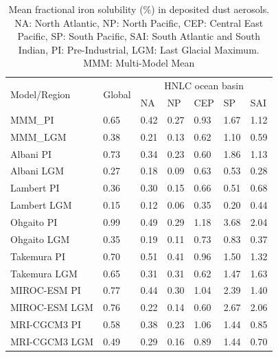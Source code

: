 \begin{table}[]
    \centering
    \begin{tabular}{||l|l|l|l|l|l|l||}
        \hline 
    \multirow{2}{*}{Model/Region} & \multirow{2}{*}{Global} & \multicolumn{5}{c}{HNLC ocean basin} \\
                                  &                         & NA    & NP    & CEP   & SP    & SAI  \\
    \hline \hline
    MMM\_PI                       & 0.65                    & 0.42  & 0.27  & 0.93  & 1.67  & 1.12 \\
    MMM\_LGM                      & 0.38                    & 0.21  & 0.13  & 0.62  & 1.10  & 0.59 \\
    Albani PI                     & 0.73                    & 0.34  & 0.23  & 0.60  & 1.86  & 1.13 \\
    Albani LGM                    & 0.27                    & 0.18  & 0.09  & 0.63  & 0.53  & 0.28 \\
    Lambert PI                    & 0.36                    & 0.30  & 0.15  & 0.66  & 0.51  & 0.68 \\
    Lambert LGM                   & 0.15                    & 0.12  & 0.06  & 0.35  & 0.20  & 0.44 \\
    Ohgaito PI                    & 0.99                    & 0.49  & 0.29  & 1.18  & 3.68  & 2.04 \\
    Ohgaito LGM                   & 0.35                    & 0.19  & 0.11  & 0.73  & 0.83  & 0.37 \\
    Takemura PI                   & 0.70                    & 0.51  & 0.41  & 0.96  & 1.50  & 1.32 \\
    Takemura LGM                  & 0.65                    & 0.31  & 0.31  & 0.62  & 1.47  & 1.63 \\
    MIROC-ESM PI                  & 0.77                    & 0.44  & 0.30  & 1.04  & 2.39  & 1.40 \\
    MIROC-ESM LGM                 & 0.76                    & 0.22  & 0.14  & 0.60  & 2.67  & 2.06 \\
    MRI-CGCM3 PI                  & 0.58                    & 0.38  & 0.23  & 1.06  & 1.44  & 0.85 \\
    MRI-CGCM3 LGM                 & 0.49                    & 0.29  & 0.16  & 0.89  & 1.44  & 0.70 \\
    \hline
    \end{tabular}
    \caption{Mean fractional iron solubility (\%) in deposited dust aerosols. NA: North Atlantic, NP: North Pacific, CEP: Central East Pacific, SP: South Pacific, SAI: South Atlantic and South Indian, PI: Pre-Industrial, LGM: Last Glacial Maximum. MMM: Multi-Model Mean}
    \end{table}

